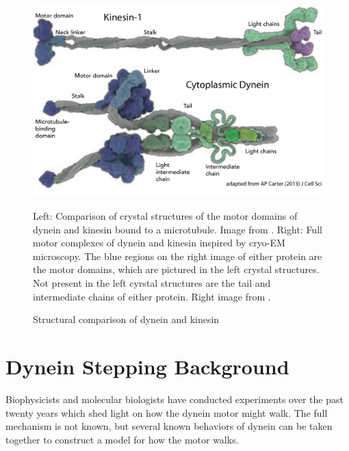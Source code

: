 \documentclass[
11pt, %
english, %
singlespacing, %
headsepline, %
chapterinoneline, %
]{MastersDoctoralThesis} %
\begin{document}
\begin{figure}[H]
\begin{minipage}{0.65\textwidth}
    \includegraphics[width=\textwidth,keepaspectratio]{../../figures/kinesin_vs_dynein_2}
  \end{minipage}
  \caption{Structural comparison of dynein and kinesin}{Left: Comparison of crystal structures of the motor domains of dynein and kinesin bound to a microtubule. Image from \cite{kinesin-vs-dynein}. Right: Full motor complexes of dynein and kinesin inspired by cryo-EM microscopy. The blue regions on the right image of either protein are the motor domains, which are pictured in the left crystal structures. Not present in the left cyrstal structures are the tail and intermediate chains of either protein. Right image from \cite{kinesin-vs-dynein-2}.}
  \label{fig:kinesin-vs-dynein}
\end{figure}

\section{Dynein Stepping Background}
Biophysicists and molecular biologists have conducted experiments over the past twenty years which shed light on how the dynein motor might walk. The full mechanism is not known, but several known behaviors of dynein can be taken together to construct a model for how the motor walks.\\
\end{document}
